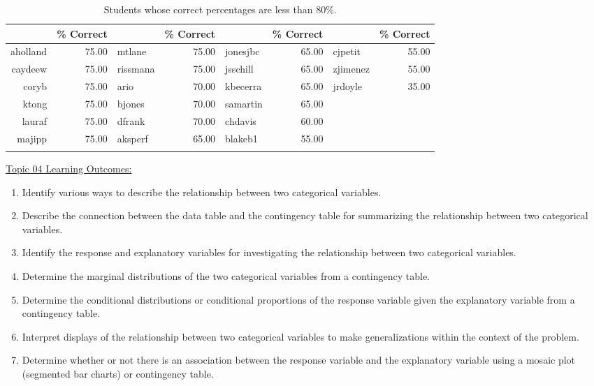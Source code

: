 \documentclass[12pt,english,nohyper]{tufte-handout}\usepackage[]{graphicx}\usepackage[]{color}
\begin{document}
\begin{fullwidth}
\makeatletter\setlength\hsize{\@tufte@fullwidth}\makeatother
\begin{longtable}{rr|lr|lr|lr}
  \hline
  & \% Correct &   & \% Correct &   & \% Correct &   & \% Correct \\ 
  \hline
aholland & 75.00 & mtlane & 75.00 & jonesjbc & 65.00 & cjpetit & 55.00 \\ 
  caydeew & 75.00 & rissmana & 75.00 & jsschill & 65.00 & zjimenez & 55.00 \\ 
  coryb & 75.00 & ario & 70.00 & kbecerra & 65.00 & jrdoyle & 35.00 \\ 
  ktong & 75.00 & bjones & 70.00 & samartin & 65.00 &  &  \\ 
  lauraf & 75.00 & dfrank & 70.00 & chdavis & 60.00 &  &  \\ 
  majipp & 75.00 & aksperf & 65.00 & blakeb1 & 55.00 &  &  \\ 
   \hline
\hline
\caption{Students whose correct percentages are less than 80\%.} 
\label{tab:studentsbelow80}
\end{longtable}

\end{fullwidth}



\vspace{-2mm}

\noindent
\underline{Topic 04 Learning Outcomes:}
\vspace{2mm}

\begin{fullwidth}
\begin{enumerate}[label=\Alph*.,itemsep=-\parsep,leftmargin=*]
  \item
Identify various ways to describe the relationship between two categorical variables.
\item Describe the connection between the data table and the contingency table for summarizing the relationship between two categorical variables.
\item Identify the response and explanatory variables for investigating the relationship between two categorical variables.
\item Determine the marginal distributions of the two categorical variables from a contingency table.
\item Determine the conditional distributions or conditional proportions of the response variable given the explanatory variable from a contingency table.
\item Interpret displays of the relationship between two categorical variables to make generalizations within the context of the problem.
\item Determine whether or not there is an association between the response variable and the explanatory variable using a mosaic plot (segmented bar charts) or contingency table.

\end{enumerate}
\end{fullwidth}
\end{document}
